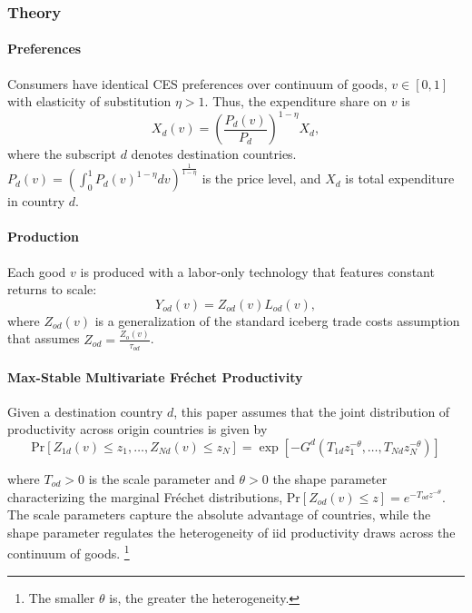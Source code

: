 \subsubsection{Theory}
\paragraph{Preferences}
Consumers have identical CES preferences over continuum of goods, $v \in [0,1]$ 
with elasticity of substitution $\eta > 1$.
Thus, the expenditure share on $v$ is 
\begin{equation}
    X_d(v) = \left(\frac{P_d(v)}{P_d}\right)^{1-\eta} X_d,
\end{equation}
where the subscript $d$ denotes destination countries.
$P_d(v) = \left(\int_0^1 P_d(v)^{1-\eta} dv \right)^{\frac{1}{1-\eta}}$
is the price level, and $X_d$ is total expenditure in country $d$.

\paragraph{Production}
Each good $v$ is produced with a labor-only technology that features constant returns to scale:
\begin{equation}
\label{eqn:production_technology}
    Y_{od}(v) = Z_{od}(v)L_{od}(v),
\end{equation}
where $Z_{od}(v)$ is a generalization of the standard iceberg trade costs assumption 
that assumes $Z_{od} = \frac{Z_o(v)}{\tau_{od}}$.

\paragraph{Max-Stable Multivariate Fr\'{e}chet Productivity}
Given a destination country $d$,
this paper assumes that the joint distribution of productivity across 
origin countries is given by
\begin{equation}
    \text{Pr}\left[Z_{1 d}(v) \leq z_1, \ldots, Z_{N d}(v) \leq z_N\right]
    =
    \exp \left[-G^d\left(T_{1 d} z_1^{-\theta}, \ldots, T_{N d} z_N^{-\theta}\right)\right]    
\end{equation}

where $T_{o d}>0$ is the scale parameter and 
$\theta>0$ the shape parameter characterizing the marginal Fr\'{e}chet distributions, 
$\text{Pr}\left[Z_{o d}(v) \leq z\right]=e^{-T_{o d} z^{-\theta}}$. 
The scale parameters capture the absolute advantage of countries, 
while the shape parameter regulates the heterogeneity of iid productivity draws across the continuum of goods.%
\footnote{
    The smaller $\theta$ is, the greater the heterogeneity.
}

